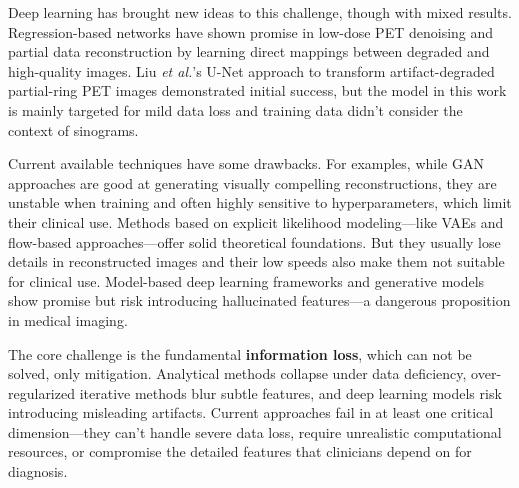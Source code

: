 \documentclass[12pt]{iopart}
\begin{document}
Deep learning has brought new ideas to this challenge, though with mixed results. Regression-based networks have shown promise in low-dose PET denoising and partial data reconstruction \cite{Kandarpa_2021} by learning direct mappings between degraded and high-quality images. Liu \textit{et al.}'s U-Net approach to transform artifact-degraded partial-ring PET images \cite{liu2019} demonstrated initial success, but the model in this work is mainly targeted for mild data loss and training data didn't consider the context of sinograms.

Current available techniques have some drawbacks.
For examples, while GAN approaches are good at generating visually compelling reconstructions, \cite{xue2023cg3dsrganclassificationguided3d} they are unstable when training and often highly sensitive to hyperparameters, which limit their clinical use.
Methods based on explicit likelihood modeling—like VAEs and flow-based approaches—offer solid theoretical foundations. But they usually lose details in reconstructed images and their low speeds also make them not suitable for clinical use.
Model-based deep learning frameworks and generative models \cite{reader2023, vashistha2024} show promise but risk introducing hallucinated features—a dangerous proposition in medical imaging.

The core challenge is the fundamental \textbf{information loss}, which can not be solved, only mitigation. Analytical methods collapse under data deficiency, over-regularized iterative methods blur subtle features, and deep learning models risk introducing misleading artifacts. Current approaches fail in at least one critical dimension—they can't handle severe data loss, require unrealistic computational resources, or compromise the detailed features that clinicians depend on for diagnosis. 
\end{document}
